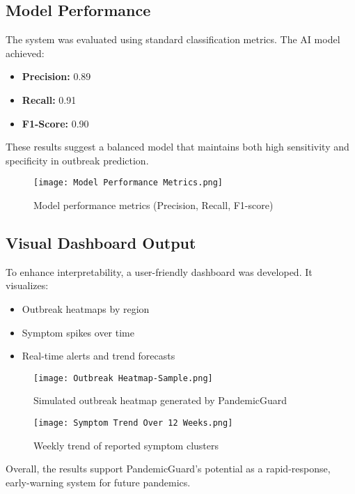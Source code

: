 \documentclass[11pt]{article}
\newcommand{\modelname}{PandemicGuard\xspace}
\begin{document}
\subsection{Model Performance}
The system was evaluated using standard classification metrics. The AI model achieved:

\begin{itemize}
    \item \textbf{Precision:} 0.89
    \item \textbf{Recall:} 0.91
    \item \textbf{F1-Score:} 0.90
\end{itemize}

These results suggest a balanced model that maintains both high sensitivity and specificity in outbreak prediction.

\begin{figure}[H]
\centering
\texttt{[image: Model Performance Metrics.png]}
\caption{Model performance metrics (Precision, Recall, F1-score)}
\label{fig:performance}
\end{figure}

\subsection{Visual Dashboard Output}
To enhance interpretability, a user-friendly dashboard was developed. It visualizes:

\begin{itemize}
    \item Outbreak heatmaps by region
    \item Symptom spikes over time
    \item Real-time alerts and trend forecasts
\end{itemize}

\begin{figure}[H]
\centering
\texttt{[image: Outbreak Heatmap-Sample.png]}
\caption{Simulated outbreak heatmap generated by \modelname}
\label{fig:heatmap}
\end{figure}

\begin{figure}[H]
\centering
\texttt{[image: Symptom Trend Over 12 Weeks.png]}
\caption{Weekly trend of reported symptom clusters}
\label{fig:trend}
\end{figure}

Overall, the results support \modelname's potential as a rapid-response, early-warning system for future pandemics.
\end{document}
